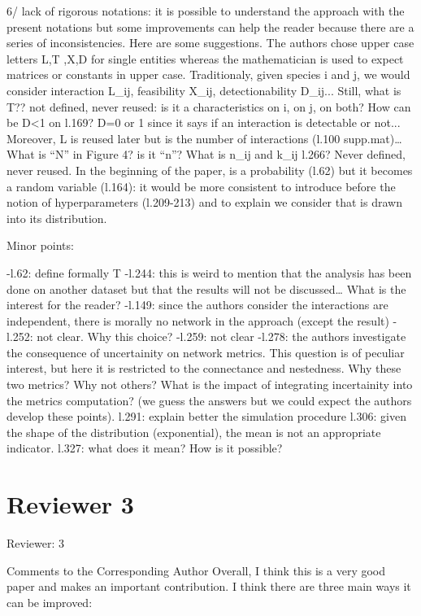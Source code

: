 6/ lack of rigorous notations: it is possible to understand the approach with the present notations but some improvements can help the reader because there are a series of inconsistencies. Here are some suggestions. The authors chose upper case letters L,T ,X,D for single entities whereas the mathematician is used to expect matrices or constants in upper case. Traditionaly, given species i and j, we would consider interaction L_ij, feasibility X_ij, detectionability D_ij...
Still, what is T?? not defined, never reused: is it a characteristics on i, on j, on both?
How can be D<1 on l.169? D=0 or 1 since it says if an interaction is detectable or not...
Moreover, L is reused later but is the number of interactions (l.100 supp.mat)…
What is “N” in Figure 4? is it “n”? What is n_ij and k_ij l.266? Never defined, never reused.
In the beginning of the paper, \lambda is a probability (l.62) but it becomes a random variable (l.164): it would be more consistent to introduce before the notion of hyperparameters  (l.209-213) and to explain we consider that \lambda is drawn into its distribution.



Minor points:

-l.62: define formally T
-l.244: this is weird to mention that the analysis has been done on another dataset but that the results will not be discussed… What is the interest for the reader?
-l.149: since the authors consider the interactions are independent, there is morally no network in the approach (except the result)
-l.252: not clear. Why this choice?
-l.259: not clear
-l.278: the authors investigate the consequence of uncertainity on network metrics. This question is of peculiar interest, but here it is restricted to the connectance and nestedness. Why these two metrics? Why not others? What is the impact of integrating incertainity into the metrics computation? (we guess the answers but we could expect the authors develop these points).
l.291: explain better the simulation procedure
l.306: given the shape of the distribution (exponential), the mean is not an appropriate indicator.
l.327: what does it mean? How is it possible?

\section*{Reviewer 3}

Reviewer: 3

Comments to the Corresponding Author
Overall, I think this is a very good paper and makes an important contribution.  I think there are three main ways it can be improved:

